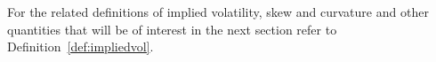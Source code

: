 For the related definitions of implied volatility, skew and curvature and other quantities that will be of interest in the next section refer to Definition~\ref{def:impliedvol}.

